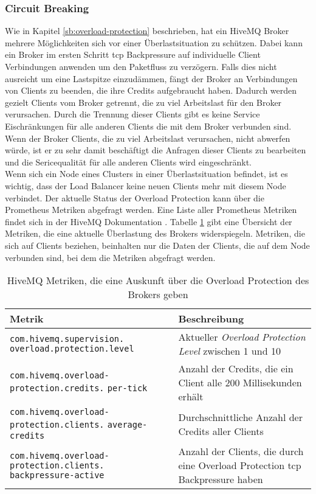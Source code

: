 \subsubsection{Circuit Breaking} \label{ss:circuit-breaking}
Wie in Kapitel \ref{sb:overload-protection} beschrieben, hat ein HiveMQ Broker mehrere Möglichkeiten sich vor einer Überlastsituation zu schützen. Dabei kann ein Broker im ersten Schritt \ac{tcp} Backpressure auf individuelle Client Verbindungen anwenden um den Paketfluss zu verzögern. Falls dies nicht ausreicht um eine Lastspitze einzudämmen, fängt der Broker an Verbindungen von Clients zu beenden, die ihre Credits aufgebraucht haben. Dadurch werden gezielt Clients vom Broker getrennt, die zu viel Arbeitslast für den Broker verursachen. Durch die Trennung dieser Clients gibt es keine Service Eischränkungen für alle anderen Clients die mit dem Broker verbunden sind. Wenn der Broker Clients, die zu viel Arbeitslast verursachen, nicht abwerfen würde, ist er zu sehr damit beschäftigt die Anfragen dieser Clients zu bearbeiten und die Sericequalität für alle anderen Clients wird eingeschränkt.
\\
Wenn sich ein Node eines Clusters in einer Überlastsituation befindet, ist es wichtig, dass der Load Balancer keine neuen Clients mehr mit diesem Node verbindet.
Der aktuelle Status der Overload Protection kann über die Prometheus Metriken abgefragt werden. Eine Liste aller Prometheus Metriken findet sich in der HiveMQ Dokumentation \cite{MonitoringHiveMQDocumentation}. Tabelle \ref{table:overload-protection-metrics} gibt eine Übersicht der Metriken, die eine aktuelle Überlastung des Brokers widerspiegeln. Metriken, die sich auf Clients beziehen, beinhalten nur die Daten der Clients, die auf dem Node verbunden sind, bei dem die Metriken abgefragt werden.\cite{ClusterOverloadProtection}
\begin{table}[htbp]
\centering
\renewcommand{\arraystretch}{1.5}
\begin{tabularx}{\textwidth}{|p{5cm}|X|}
    \hline
    \textbf{Metrik} & \textbf{Beschreibung} \\
    \hline
    \hline
    \verb|com.hivemq.supervision.| \verb|overload.protection.level| & Aktueller \textit{Overload Protection Level} zwischen 1 und 10 \\
    \hline
    \verb|com.hivemq.overload-| \verb|protection.credits.| \verb|per-tick| & Anzahl der Credits, die ein Client alle 200 Millisekunden erhält \\
    \hline
    \verb|com.hivemq.overload-| \verb|protection.clients.| \verb|average-credits| & Durchschnittliche Anzahl der Credits aller Clients \\
    \hline
    \verb|com.hivemq.overload-| \verb|protection.clients.| \verb|backpressure-active| & Anzahl der Clients, die durch eine Overload Protection \ac{tcp} Backpressure haben \\
    \hline
\end{tabularx}
\caption{HiveMQ Metriken, die eine Auskunft über die Overload Protection des Brokers geben}
\label{table:overload-protection-metrics}
\end{table}

